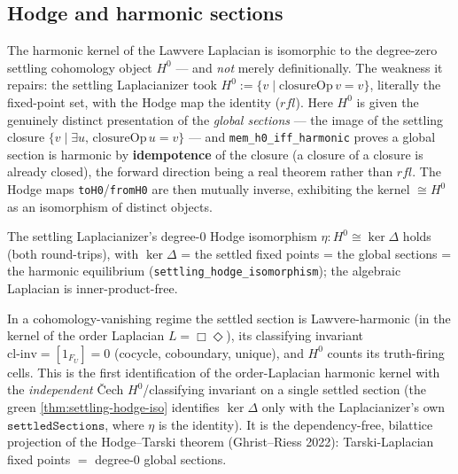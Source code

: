 \subsection{Hodge and harmonic sections}

\begin{theorem}\label{thm:lawvere-kernel-h0-iso}\leanok{}
The harmonic kernel of the Lawvere Laplacian is isomorphic to the degree-zero settling cohomology
object $H^0$ --- and \emph{not} merely definitionally. The weakness it repairs: the settling
Laplacianizer took $H^0 := \{v \mid \mathrm{closureOp}\,v = v\}$, literally the fixed-point set, with
the Hodge map the identity ($\mathit{rfl}$). Here $H^0$ is given the genuinely distinct presentation
of the \emph{global sections} --- the image of the settling closure $\{v \mid \exists u,\,
\mathrm{closureOp}\,u = v\}$ --- and \texttt{mem\_h0\_iff\_harmonic} proves a global section is
harmonic by \textbf{idempotence} of the closure (a closure of a closure is already closed), the
forward direction being a real theorem rather than $\mathit{rfl}$. The Hodge maps
\texttt{toH0}/\texttt{fromH0} are then mutually inverse, exhibiting the kernel $\cong H^0$ as an
isomorphism of distinct objects.
\end{theorem}

\begin{theorem}\label{thm:settling-hodge-iso}\leanok{}
The settling Laplacianizer's degree-$0$ Hodge isomorphism $\eta : H^0 \cong \ker\Delta$ holds (both
round-trips), with $\ker\Delta$ = the settled fixed points = the global sections = the harmonic
equilibrium (\texttt{settling\_hodge\_isomorphism}); the algebraic Laplacian is inner-product-free.
\end{theorem}

\begin{theorem}[Lawvere-harmonic section $=$ cohomologically-trivial global section]\label{thm:lawvere-harmonic-clinv-zero}\leanok{}
In a cohomology-vanishing regime the settled section is Lawvere-harmonic (in the kernel of the
order Laplacian $L=\Box\Diamond$), its classifying invariant $\mathrm{cl\text{-}inv}=[1_{F_U}]=0$
(cocycle, coboundary, unique), and $H^0$ counts its truth-firing cells. This is the first
identification of the order-Laplacian harmonic kernel with the \emph{independent} \v{C}ech
$H^0$/classifying invariant on a single settled section (the green \cref{thm:settling-hodge-iso}
identifies $\ker\Delta$ only with the Laplacianizer's own $\texttt{settledSections}$, where $\eta$ is
the identity). It is the dependency-free, bilattice projection of the Hodge--Tarski theorem
(Ghrist--Riess 2022): Tarski-Laplacian fixed points $=$ degree-$0$ global sections.
\end{theorem}
